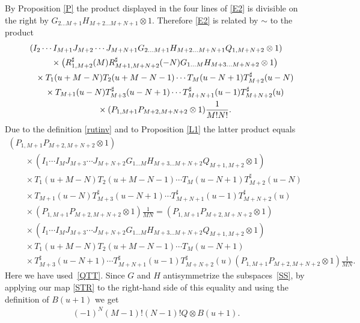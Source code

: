 \documentclass[pdftex]{sigma}
\numberwithin{equation}{section}
\def\ot{\otimes}
\def\RS{R^{\sharp}}
\def\TS{T^{\sharp}}
\begin{document}
By Proposition \ref{P} the product displayed in the four lines of \eqref{E2}
is divisible on the right by
$G_{2 \dots M+1} H_{M+2 \dots M+N+1}\ot1$.
Therefore \eqref{E2} is related by $\sim$ to the product
\begin{gather*}
( I_{2} \cdots I_{M+1}
J_{M+2} \cdots J_{M+N+1}
G_{2 \dots M+1} H_{M+2 \dots M+N+1}
Q_{1,M+N+2}\ot1 )\notag\\ \qquad{} \times
\big(\RS_{1,M+2} (M ) \RS_{M+1,M+N+2} (-N )
G_{1 \dots M} H_{M+3 \dots M+N+2}\ot1 \big)\notag
\\
\qquad{} \times
T_1 (u+M-N) T_2 (u+M-N-1) \cdots T_{M} (u-N+1)
\TS_{M+2} (u-N)\notag
\\ \qquad{} \times
T_{M+1} (u-N)
\TS_{M+3} (u-N+1) \cdots \TS_{M+N+1} (u-1) \TS_{M+N+2} (u)\notag
\\ \qquad{} \times
( P_{1,M+1} P_{M+2,M+N+2}\ot1 ) \frac1{M ! N !} .%
\end{gather*}
Due to the definition \eqref{rutinv} and to
Proposition \ref{L1} the latter product equals
\begin{gather*}
( P_{1,M+1} P_{M+2,M+N+2}\ot1 )\\
\qquad {} \times
( I_{1} \cdots I_{M}
J_{M+3} \cdots J_{M+N+2}
G_{1 \dots M} H_{M+3 \dots M+N+2}
Q_{M+1,M+2}\ot1 )\\
\qquad {} \times
T_1 (u+M-N) T_2 (u+M-N-1) \cdots T_{M} (u-N+1)
\TS_{M+2} (u-N)\\
\qquad {} \times
T_{M+1} (u-N)
\TS_{M+3} (u-N+1) \cdots \TS_{M+N+1} (u-1) \TS_{M+N+2} (u)\\
\qquad {} \times
( P_{1,M+1} P_{M+2,M+N+2}\ot1 ) \frac1{M N} =
( P_{1,M+1} P_{M+2,M+N+2}\ot1 )\\
\qquad {} \times
( I_{1} \cdots I_{M}
J_{M+3} \cdots J_{M+N+2}
G_{1 \dots M} H_{M+3 \dots M+N+2}
Q_{M+1,M+2}\ot1 )\\
\qquad {} \times
T_1 (u+M-N) T_2 (u+M-N-1) \cdots T_{M} (u-N+1)\\
\qquad {} \times
\TS_{M+3} (u-N+1) \cdots \TS_{M+N+1} (u-1) \TS_{M+N+2} (u)
( P_{1,M+1} P_{M+2,M+N+2}\ot1 ) \frac1{M N} .
\end{gather*}
Here we have used~\eqref{QTT}. Since $G$ and $H$ antisymmetrize the subspaces~\eqref{SS},
by applying our map \eqref{STR} to the right-hand side
of this equality and using the definition of $B(u+1)$ we get
\begin{gather}
\label{BQ}
(-1)^N (M-1) ! (N-1) ! Q\ot B(u+1) .
\end{gather}
\end{document}
